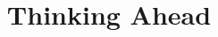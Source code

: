 \documentclass{ximera}
\title{Thinking Ahead}
\begin{document}
\begin{abstract}
\end{abstract}

\maketitle
\end{document}
